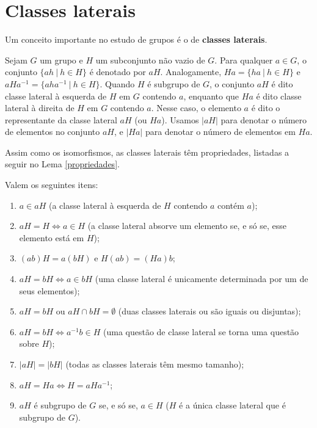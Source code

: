 \section{Classes laterais}
\label{sec-classes-laterais}
    Um conceito importante no estudo de grupos é o de 
    \textbf{classes laterais}.
	\begin{definition}
	\label{def classes laterais}
		Sejam $G$ um grupo e $H$ um subconjunto não vazio de $G$. 
		Para qualquer $a\in G$,	o conjunto $\{ah \ | \ h \in H \}$ é 
		denotado por $aH$. Analogamente, $Ha = \{ha \ | \ h \in H\}$
		e $aHa^{-1} = \{aha^{-1} \ | \ h \in H\}$. Quando $H$ é subgrupo de $G$,
		o conjunto $aH$ é dito classe lateral à esquerda de $H$ em $G$
		contendo $a$, enquanto que $Ha$ é dito classe lateral à direita 
		de $H$ em $G$ contendo $a$. Nesse caso, o elemento $a$ é dito o
		representante da classe lateral $aH$ (ou $Ha$). Usamos $|aH|$ para
		denotar o número de elementos no conjunto $aH$, e $|Ha|$ para 
		denotar o número de elementos em $Ha$.
	\end{definition}
	Assim como os isomorfismos, as classes laterais têm propriedades, listadas a seguir no Lema \ref{propriedades}.
	\begin{lemma}
	\label{propriedades}
	    Valem os seguintes itens:
		\begin{enumerate}
			\item $a\in aH$ (a classe lateral à esquerda de $H$ contendo 
			$a$ contém $a$); 
			\item $aH = H \iff a\in H$ (a classe lateral absorve um 
			elemento se, e só se, esse elemento está em $H$);
			\item $(ab)H = a(bH)$ e $H(ab) = (Ha)b$;
			\item $aH = bH \iff a\in bH$ (uma classe lateral é unicamente
			determinada por um de seus elementos);
			\item $aH = bH$ ou $aH \cap bH = \emptyset$ (duas classes 
			laterais ou são iguais ou disjuntas);
			\item $aH = bH \iff a^{-1}b\in H$ (uma questão de classe 
			lateral se torna uma questão sobre $H$);
			\item $|aH| = |bH|$ (todas as classes laterais têm mesmo tamanho);
			\item $aH = Ha \iff H = aHa^{-1}$;
			\item $aH$ é subgrupo de $G$ se, e só se, $a\in H$ ($H$ é a 
			única classe lateral que é subgrupo de $G$).
		\end{enumerate}
	\end{lemma}

